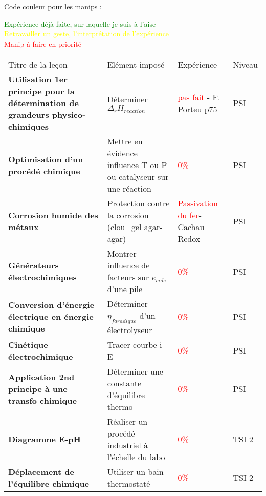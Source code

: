 \newpage
\begin{changemargin}{-1.5cm}{-0cm}
Code couleur pour les manips :\\
\begin{center}
\textcolor{green}{Expérience déjà faite, sur laquelle je suis à l'aise}\\
\textcolor{yellow}{Retravailler un geste, l'interprétation de l'expérience}\\
\textcolor{red}{Manip à faire en priorité}\\
\end{center}

\begin{tabularx}{\paperwidth-2cm}{| X | X | X | X |}
  \hline
  \rowcolor{gray!20}\multicolumn{4}{c}{Avancement préparation oraux Leçons Chimie} \\
  \hline 
  Titre de la leçon & Elément imposé & Expérience & Niveau \\
  \hline
  \textbf{Utilisation 1er principe pour la détermination de grandeurs physico-chimiques} & Déterminer $\Delta_rH_{reaction}$ & \textcolor{red}{pas fait} - F. Porteu p75 & PSI \\
  \hline
  \textbf{Optimisation d'un procédé chimique} & Mettre en évidence influence T ou P ou catalyseur sur une réaction & \textcolor{red}{0\%} & PSI \\
  \hline
  \textbf{Corrosion humide des métaux} & Protection contre la corrosion (clou+gel agar-agar) & \textcolor{red}{Passivation du fer}-Cachau Redox & PSI \\
  \hline
  \textbf{Générateurs électrochimiques} & Montrer influence de facteurs sur $e_{vide}$ d'une pile & \textcolor{red}{0\%} & PSI \\
  \hline
  \textbf{Conversion d'énergie électrique en énergie chimique} & Déterminer $\eta_{faradique}$ d'un électrolyseur & \textcolor{red}{0\%} & PSI \\
  \hline
  \textbf{Cinétique électrochimique} & Tracer courbe i-E & \textcolor{red}{0\%} & PSI \\
  \hline
  \textbf{Application 2nd principe à une transfo chimique} & Déterminer une constante d'équilibre thermo & \textcolor{red}{0\%} & PSI \\
  \hline
  \hline
  \textbf{Diagramme E-pH} & Réaliser un procédé industriel à l'échelle du labo & \textcolor{red}{0\%} & TSI 2 \\
  \hline
  \textbf{Déplacement de l'équilibre chimique} & Utiliser un bain thermostaté & \textcolor{red}{0\%} & TSI 2 \\
  \hline  
\end{tabularx}


\end{changemargin}
